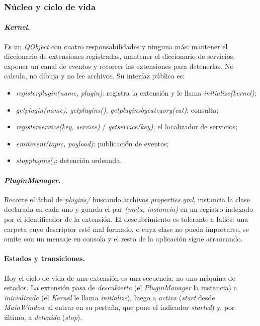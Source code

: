 \documentclass[12pt,letterpaper,oneside]{article}
\DeclareRobustCommand{\_}{\textunderscore\allowbreak}
\begin{document}
\subsubsection{Núcleo y ciclo de vida}

\paragraph{\textit{Kernel}.} Es un \textit{QObject} con cuatro responsabilidades y ninguna más: mantener el diccionario de extensiones registradas, mantener el diccionario de servicios, exponer un canal de eventos y recorrer las extensiones para detenerlas. No calcula, no dibuja y no lee archivos. Su interfaz pública es:

\begin{itemize}
    \item \textit{register\_plugin(name,} \textit{plugin)}: registra la extensión y le llama \allowbreak\textit{initialize(kernel)};
    \item \textit{get\_plugin(name)}, \textit{get\_plugins()}, \textit{get\_plugins\_by\_category(cat)}: consulta;
    \item \textit{register\_service(key, service)} / \textit{get\_service(key)}: el localizador de servicios;
    \item \textit{emit\_event(topic, payload)}: publicación de eventos;
    \item \textit{stop\_plugins()}: detención ordenada.
\end{itemize}

\paragraph{\textit{PluginManager}.} Recorre el árbol de \textit{plugins/} buscando archivos \textit{properties.yml}, instancia la clase declarada en cada uno y guarda el par \textit{(meta, instancia)} en un registro indexado por el identificador de la extensión. El descubrimiento es tolerante a fallos: una carpeta cuyo descriptor esté mal formado, o cuya clase no pueda importarse, se omite con un mensaje en consola y el resto de la aplicación sigue arrancando.

\paragraph{Estados y transiciones.} Hoy el ciclo de vida de una extensión es una secuencia, no una máquina de estados. La extensión pasa de \textit{descubierta} (el \textit{PluginManager} la instancia) a \textit{inicializada} (el \textit{Kernel} le llama \textit{initialize}), luego a \textit{activa} (\textit{start} desde \textit{MainWindow} al entrar en su pestaña, que pone el indicador \textit{started}) y, por último, a \textit{detenida} (\textit{stop}).
\end{document}
